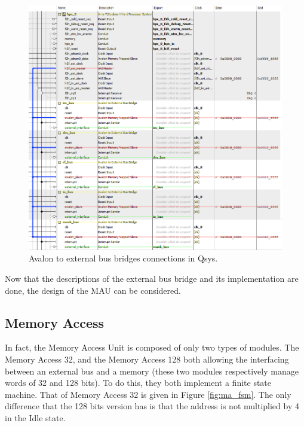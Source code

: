 \begin{figure}[ht!]
    \center
    \includegraphics[width=\linewidth]{"Chapter5-MAU_CTRLU/res/qsys_mau.PNG"}
    \caption{Avalon to external bus bridges connections in Qsys.}
    \label{fig:avalon/bus}
\end{figure}

Now that the descriptions of the external bus bridge and its implementation are done, the design of 
the MAU can be considered.

\subsection{Memory Access}

In fact, the Memory Access Unit is composed of only two types of modules. The Memory Access 32, and 
the Memory Access 128 both allowing the interfacing between an external bus and a memory (these two
modules respectively manage words of 32 and 128 bits). To do this, they both implement a finite state machine. 
That of Memory Access 32 is given in Figure \ref{fig:ma_fsm}. The only difference that the 128 bits version 
has is that the address is not multiplied by 4 in the Idle state. 

